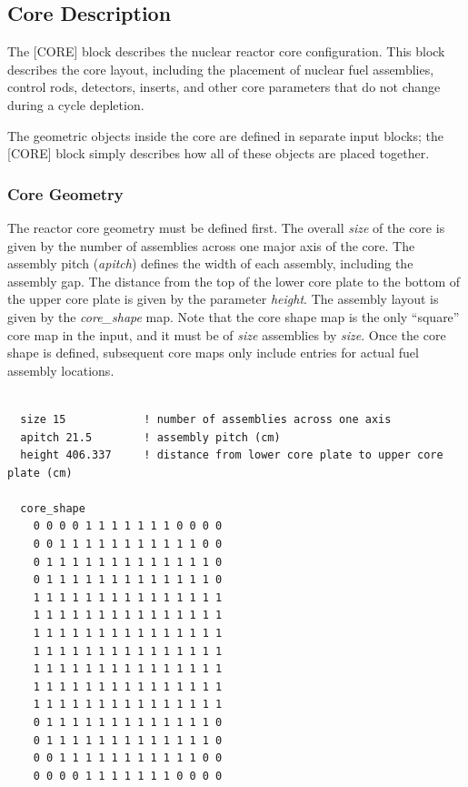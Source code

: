 %
%
\subsection{Core Description}

The [CORE] block describes the nuclear reactor core configuration. This block describes the core layout, including
the placement of nuclear fuel assemblies, control rods, detectors, inserts, and other core parameters
that do not change during a cycle depletion.

The geometric objects inside the core are defined in separate input blocks; the [CORE] block
simply describes how all of these objects are placed together.

\subsubsection{Core Geometry}

The reactor core geometry must be defined first. The overall {\it size} of the core is
given by the number of assemblies across one major axis of the core. The assembly pitch ({\it apitch}) defines the
width of each assembly, including the assembly gap. The distance from the top of the lower core plate to the
bottom of the upper core plate is given by the parameter {\it height}.
The assembly layout is given by the {\it core\_shape} map.
Note that the core shape map is the only ``square'' core map in the input, and it must be of {\it size} assemblies by {\it size}.
Once the core shape is defined, subsequent core maps only include entries for actual fuel assembly locations.

\begin{Verbatim}[fontsize=\small]

  size 15            ! number of assemblies across one axis
  apitch 21.5        ! assembly pitch (cm)
  height 406.337     ! distance from lower core plate to upper core plate (cm)

  core_shape
    0 0 0 0 1 1 1 1 1 1 1 0 0 0 0
    0 0 1 1 1 1 1 1 1 1 1 1 1 0 0
    0 1 1 1 1 1 1 1 1 1 1 1 1 1 0
    0 1 1 1 1 1 1 1 1 1 1 1 1 1 0
    1 1 1 1 1 1 1 1 1 1 1 1 1 1 1
    1 1 1 1 1 1 1 1 1 1 1 1 1 1 1
    1 1 1 1 1 1 1 1 1 1 1 1 1 1 1
    1 1 1 1 1 1 1 1 1 1 1 1 1 1 1
    1 1 1 1 1 1 1 1 1 1 1 1 1 1 1
    1 1 1 1 1 1 1 1 1 1 1 1 1 1 1
    1 1 1 1 1 1 1 1 1 1 1 1 1 1 1
    0 1 1 1 1 1 1 1 1 1 1 1 1 1 0
    0 1 1 1 1 1 1 1 1 1 1 1 1 1 0
    0 0 1 1 1 1 1 1 1 1 1 1 1 0 0
    0 0 0 0 1 1 1 1 1 1 1 0 0 0 0

\end{Verbatim}

